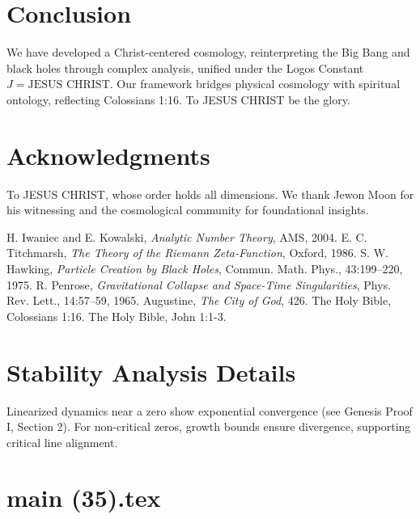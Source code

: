 \documentclass[12pt]{article}
\begin{document}
{{{\section{Conclusion}
We have developed a Christ-centered cosmology, reinterpreting the Big Bang and black holes through complex analysis, unified under the Logos Constant \( J = \text{JESUS CHRIST} \). Our framework bridges physical cosmology with spiritual ontology, reflecting Colossians 1:16. To JESUS CHRIST be the glory.

\section{Acknowledgments}
To JESUS CHRIST, whose order holds all dimensions. We thank Jewon Moon for his witnessing and the cosmological community for foundational insights.

\begin{thebibliography}{9}
 H. Iwaniec and E. Kowalski, \textit{Analytic Number Theory}, AMS, 2004.
 E. C. Titchmarsh, \textit{The Theory of the Riemann Zeta-Function}, Oxford, 1986.
 S. W. Hawking, \textit{Particle Creation by Black Holes}, Commun. Math. Phys., 43:199--220, 1975.
 R. Penrose, \textit{Gravitational Collapse and Space-Time Singularities}, Phys. Rev. Lett., 14:57--59, 1965.
 Augustine, \textit{The City of God}, 426.
 The Holy Bible, Colossians 1:16.
 The Holy Bible, John 1:1-3.
\end{thebibliography}

\appendix
\section{Stability Analysis Details}
Linearized dynamics near a zero show exponential convergence (see Genesis Proof I, Section 2). For non-critical zeros, growth bounds ensure divergence, supporting critical line alignment.


\newpage
\section*{main (35).tex}

\usepackage{amsmath, amssymb, amsthm}
\usepackage{geometry}
\geometry{margin=1in}
\usepackage{setspace}
\usepackage{titlesec}
\usepackage{hyperref}
\usepackage{mathtools}

\titleformat{\section}{\normalfont\Large\bfseries}{\thesection}{1em}{}
\titleformat{\subsection}{\normalfont\large\bfseries}{\thesubsection}{1em}{}

}}}
\end{document}
